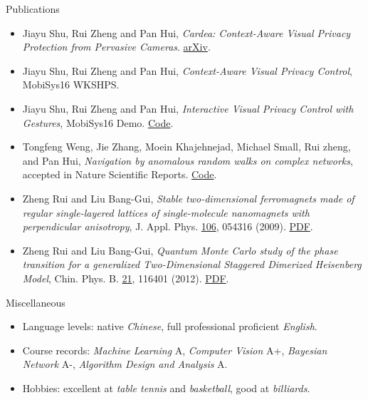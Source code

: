 \documentclass{resume} %
\begin{document}
\begin{rSection}{Publications}

\begin{itemize}[label=\raisebox{0.25ex}{\tiny\JackStarBold}]
  \item Jiayu Shu, Rui Zheng and Pan Hui, \emph{Cardea: Context-Aware Visual Privacy Protection from Pervasive Cameras}. \href{https://arxiv.org/abs/1610.00889}{\textsf{arXiv}}.

\item Jiayu Shu, Rui Zheng and Pan Hui, \emph{Context-Aware Visual Privacy Control}, \textsf{MobiSys16 WKSHPS}.

\item Jiayu Shu, Rui Zheng and Pan Hui, \emph{Interactive Visual Privacy Control with Gestures}, \textsf{MobiSys16 Demo}. \href{https://github.com/ZhengRui/mobisys16demo}{Code}.

\item Tongfeng Weng, Jie Zhang, Moein Khajehnejad, Michael Small, Rui zheng, and Pan Hui, \emph{Navigation by anomalous random walks on complex networks}, accepted in \textsf{Nature Scientific Reports}. \href{https://github.com/ZhengRui/mean-first-passage}{Code}.

\item Zheng Rui and Liu Bang-Gui, \emph{Stable two-dimensional ferromagnets made of regular single-layered lattices of single-molecule nanomagnets with perpendicular anisotropy}, \textsf{J. Appl. Phys.} \underline{106}, 054316 (2009). \href{http://bit.ly/29aBRQD}{PDF}.

\item Zheng Rui and Liu Bang-Gui, \emph{Quantum Monte Carlo study of the phase transition for a generalized Two-Dimensional Staggered Dimerized Heisenberg Model}, \textsf{Chin. Phys. B.} \underline{21}, 116401 (2012). \href{http://bit.ly/29aBDJb}{PDF}.
\end{itemize}

\end{rSection}

\begin{rSection}{Miscellaneous}
\begin{itemize}[label=\raisebox{0.25ex}{\tiny\JackStarBold}]
    \item Language levels: native {\it Chinese}, full professional proficient {\it English}.
    \item Course records: {\it Machine Learning} {\color{DarkOrchid} A}, {\it Computer Vision} {\color{DarkOrchid} A+}, {\it Bayesian Network} {\color{DarkOrchid} A-}, {\it Algorithm Design and Analysis} {\color{DarkOrchid} A}.
    \item Hobbies: excellent at {\it table tennis} and {\it basketball}, good at {\it billiards}.
\end{itemize}
\end{rSection}
\end{document}
